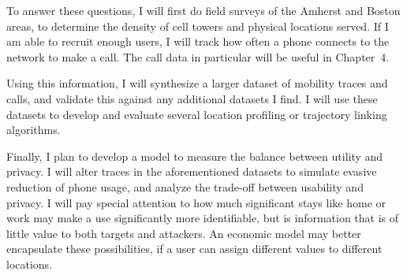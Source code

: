 To answer these questions, I will first do field surveys of the Amherst and Boston areas, to determine the density of cell towers and physical locations served. If I am able to recruit enough users, I will track how often a phone connects to the network to make a call. The call data in particular will be useful in Chapter~4. 

Using this information, I will synthesize a larger dataset of mobility traces and calls, and validate this against any additional datasets I find. I will use these datasets to develop and evaluate several location profiling or trajectory linking algorithms. 

Finally, I plan to develop a model to measure the balance between utility and privacy. I will alter traces in the aforementioned datasets to simulate evasive reduction of phone usage, and analyze the trade-off between usability and privacy. I will pay special attention to how much significant stays like home or work may make a use significantly more identifiable, but is information that is of little value to both targets and attackers. An economic model may better encapsulate these possibilities, if a user can assign different values to different locations.


